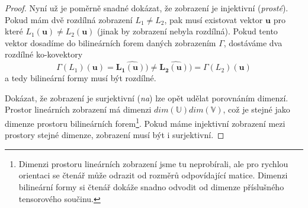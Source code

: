 \documentclass[a5paper,12pt]{amsbook}
\theoremstyle{definition}
\newcommand{\myvec}[1]{\bm{#1}}
\newcommand{\myspace}[1]{\mathbb{#1}}
\newcommand{\mycocovec}[1]{\mathbf{\widehat{#1}}}
\begin{document}
\begin{proof}
Nyní už je poměrně snadné dokázat, že zobrazení je injektivní (\textit{prosté}). Pokud mám
dvě rozdílná zobrazení $L_1 \neq L_2$, pak musí existovat vektor $\myvec{u}$ pro které
$L_1(\myvec{u}) \neq L_2(\myvec{u})$ (jinak by zobrazení nebyla rozdílná). Pokud tento vektor
dosadíme do bilineárních forem daných zobrazením $\Gamma$, dostáváme dva rozdílné ko-kovektory 
\begin{equation*}
\Gamma(L_1)(\myvec{u}) = \mycocovec{L_1(\myvec{u}))} \neq
    \mycocovec{L_2(\myvec{u}))} = \Gamma(L_2)(\myvec{u})
\end{equation*}
a tedy bilineární formy musí být rozdílné.

Dokázat, že zobrazení je surjektivní (\textit{na}) lze opět udělat porovnáním dimenzí. Prostor
lineárních zobrazení má dimenzi $dim(\myspace{U})dim(\myspace{V})$, což je stejné jako dimenze
prostoru bilineárních forem\footnote{
    Dimenzi prostoru lineárních zobrazení jsme tu neprobírali, ale pro rychlou orientaci se
    čtenář může odrazit od rozměrů odpovídající matice. Dimenzi bilineární formy si čtenář
    dokáže snadno odvodit od dimenze příslušného tensorového součinu.
}. Pokud máme injektivní zobrazení mezi prostory stejné dimenze, zobrazení musí být i surjektivní.
\end{proof}
\end{document}
